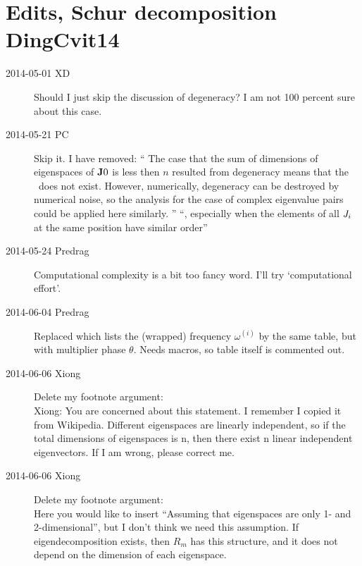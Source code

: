 

\section{Edits, Schur decomposition DingCvit14}

\begin{description}

\item[2014-05-01 XD]
Should I just skip the discussion of degeneracy? I am not 100
percent sure about this case.

\item[2014-05-21 PC] Skip it. I have removed: ``
The case that the sum of
dimensions of eigenspaces of ${\bf J}{0}$ is less then $n$ resulted
from degeneracy means that the \ped\ does not exist. However, numerically,
degeneracy can be destroyed by numerical noise, so the analysis for
the case of complex eigenvalue pairs could be applied here similarly.
''
``, especially when the elements of all $J_{i}$ at the same position
have similar order''


\item[2014-05-24 Predrag]
{Computational complexity} is a bit too fancy word. I'll try
`computational effort'.

\item[2014-06-04 Predrag]
Replaced  which lists
the (wrapped) frequency $\omega^{(i)}$ by the same table, but
with multiplier phase $\theta$. Needs macros, so table itself is commented out.

\item[2014-06-06 Xiong]
Delete my footnote argument: \\
Xiong: You are concerned about this statement. I remember I
copied it from Wikipedia. Different eigenspaces are linearly independent,
so if the total dimensions of eigenspaces is n, then there exist n
linear independent eigenvectors. If I am wrong, please correct me.

\item[2014-06-06 Xiong]
Delete my footnote argument: \\
Here you would like to insert ``Assuming that
eigenspaces are only 1- and 2-dimensional'', but I don't think
we need this assumption. If eigendecomposition exists, then
$R_m$ has this structure, and it does not depend on the dimension
of each eigenspace.


\end{description}

